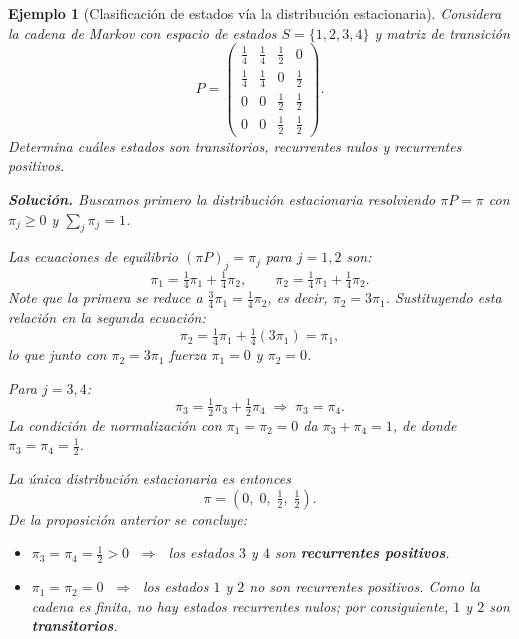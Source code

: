\documentclass[12pt]{book}
\newtheorem{example}{Ejemplo}[chapter]
\begin{document}
\begin{example}[Clasificación de estados vía la distribución estacionaria]
    Considera la cadena de Markov con espacio de estados $S = \{1, 2, 3, 4\}$ y matriz de transición
    \[
        P =
        \begin{pmatrix}
            \tfrac{1}{4} & \tfrac{1}{4} & \tfrac{1}{2} & 0 \\[4pt]
            \tfrac{1}{4} & \tfrac{1}{4} & 0 & \tfrac{1}{2} \\[4pt]
            0 & 0 & \tfrac{1}{2} & \tfrac{1}{2} \\[4pt]
            0 & 0 & \tfrac{1}{2} & \tfrac{1}{2}
        \end{pmatrix}.
    \]
    Determina cuáles estados son transitorios, recurrentes nulos y recurrentes positivos.

    \medskip
    \textbf{Solución.} Buscamos primero la distribución estacionaria resolviendo $\pi P = \pi$ con $\pi_j \ge 0$ y $\sum_j \pi_j = 1$.

    \smallskip
    Las ecuaciones de equilibrio $(\pi P)_j = \pi_j$ para $j = 1, 2$ son:
    \[
        \pi_1 = \tfrac{1}{4}\pi_1 + \tfrac{1}{4}\pi_2, \qquad \pi_2 = \tfrac{1}{4}\pi_1 + \tfrac{1}{4}\pi_2.
    \]
    Note que la primera se reduce a $\tfrac{3}{4}\pi_1 = \tfrac{1}{4}\pi_2$, es decir, $\pi_2 = 3\pi_1$. Sustituyendo esta relación en la segunda ecuación:
    \[
        \pi_2 = \tfrac{1}{4}\pi_1 + \tfrac{1}{4}(3\pi_1) = \pi_1,
    \]
    lo que junto con $\pi_2 = 3\pi_1$ fuerza $\pi_1 = 0$ y $\pi_2 = 0$.

    \smallskip
    Para $j = 3, 4$:
    \[
        \pi_3 = \tfrac{1}{2}\pi_3 + \tfrac{1}{2}\pi_4 \;\Longrightarrow\; \pi_3 = \pi_4.
    \]
    La condición de normalización con $\pi_1 = \pi_2 = 0$ da $\pi_3 + \pi_4 = 1$, de donde $\pi_3 = \pi_4 = \tfrac{1}{2}$.

    \smallskip
    La única distribución estacionaria es entonces
    \[
        \pi = \left(0,\; 0,\; \tfrac{1}{2},\; \tfrac{1}{2}\right).
    \]
    De la proposición anterior se concluye:
    \begin{itemize}
        \item $\pi_3 = \pi_4 = \tfrac{1}{2} > 0$ $\;\Rightarrow\;$ los estados $3$ y $4$ son \textbf{recurrentes positivos}.
        \item $\pi_1 = \pi_2 = 0$ $\;\Rightarrow\;$ los estados $1$ y $2$ no son recurrentes positivos. Como la cadena es finita, no hay estados recurrentes nulos; por consiguiente, $1$ y $2$ son \textbf{transitorios}.
    \end{itemize}
\end{example}
\end{document}
